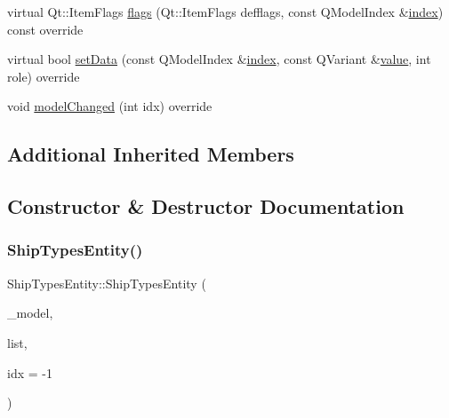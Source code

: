 \begin{DoxyCompactItemize}
\item 
virtual Qt\+::\+Item\+Flags \mbox{\hyperlink{classobjecttree_1_1_ship_types_entity_a382120055737f7e652bbd5584b9e034c}{flags}} (Qt\+::\+Item\+Flags defflags, const Q\+Model\+Index \&\mbox{\hyperlink{classobjecttree_1_1_ship_types_entity_a0ce8b95e0324fe6d91de55e71b4de5fa}{index}}) const override
\item 
virtual bool \mbox{\hyperlink{classobjecttree_1_1_ship_types_entity_a1f6fcc4a1176f53a3f2929aee6bccfeb}{set\+Data}} (const Q\+Model\+Index \&\mbox{\hyperlink{classobjecttree_1_1_ship_types_entity_a0ce8b95e0324fe6d91de55e71b4de5fa}{index}}, const Q\+Variant \&\mbox{\hyperlink{diffusion_8cpp_a4b41795815d9f3d03abfc739e666d5da}{value}}, int role) override
\item 
void \mbox{\hyperlink{classobjecttree_1_1_ship_types_entity_ac6de6e4f2f20d054cfb956d7bc8cf875}{model\+Changed}} (int idx) override
\end{DoxyCompactItemize}
\subsection*{Additional Inherited Members}


\subsection{Constructor \& Destructor Documentation}
\mbox{\label{classobjecttree_1_1_ship_types_entity_ac3ba187ce9db2639ad2cbcb9f6182530}} 
\subsubsection{\texorpdfstring{ShipTypesEntity()}{ShipTypesEntity()}}
{\footnotesize\ttfamily Ship\+Types\+Entity\+::\+Ship\+Types\+Entity (\begin{DoxyParamCaption}\item[{\mbox{\hyperlink{class_object_tree_model}{Object\+Tree\+Model}} $\ast$}]{\+\_\+model,  }\item[{std\+::shared\+\_\+ptr$<$ \mbox{\hyperlink{class_interesting_list_with_special_values}{Interesting\+List\+With\+Special\+Values}}$<$ int $>$$>$}]{list,  }\item[{int}]{idx = {\ttfamily -\/1} }\end{DoxyParamCaption})\hspace{0.3cm}{\ttfamily [explicit]}}



